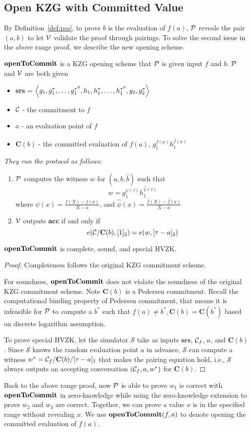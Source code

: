 \subsection{Open KZG with Committed Value}
\label{sec:kzgOpenComm}
By Definition~\ref{def:pcs}, to prove $b$ is the evaluation of $f(a)$, $\mathcal{P}$ reveals the pair $(a,b)$ to let $\mathcal{V}$ validate the proof through pairings. To solve the second issue in the above range proof, we describe the new opening scheme.
\begin{definition}[$\openc$]
$\openc$ is a KZG opening scheme that $\mathcal{P}$ is given input $f$ and $b$. $\mathcal{P}$ and $\mathcal{V}$ are both given
\begin{itemize}
    \item \textbf{srs} = $\left \langle g_1,g_1^\tau,\dots,g_1^{\tau^d},h_1,h_1^\tau,\dots,h_1^{\tau^d},g_2,g_2^\tau \right \rangle$
    \item $\mathcal{C}$ - the commitment to $f$
    \item $a$ - an evaluation point of $f$
    \item $\textbf{C}(b)$ - the committed evaluation of $f(a)$, $g_1^{f(a)}h_1^{\hat{f}(a)}$
\end{itemize}
\textit{They run the protocol as follows:}
\begin{enumerate}
    \item $\mathcal{P}$ computes the witness $w$ for $(a,b,\hat{b})$ such that
    \[ w=g_1^{\psi(\tau)}h_1^{\hat\psi(\tau)} \]
    where $\psi(x)=\frac{f(X)-f(a)}{X-a}$, and $\hat\psi(x)=\frac{\hat{f}(X)-\hat{f}(a)}{X-a}$
    \item $\mathcal{V}$ outputs \textbf{acc} if and only if
    \[ e(\mathcal{C}/\textbf{C}(b),[1]_2)=e(w,[\tau-a]_2) \]
\end{enumerate}
\end{definition}
\begin{theorem}
\label{thm:kzgOpen}
$\openc$ is complete, sound, and special HVZK.
\end{theorem}
\begin{proof}
Completeness follows the original KZG commitment scheme.

For soundness, $\openc$ does not violate the soundness of the original KZG commitment scheme. Note $\textbf{C}(b)$ is a Pedersen commitment. Recall the computational binding property of Pedersen commitment, that means it is infeasible for $\mathcal{P}$ to compute a $b^*$ such that $f(a)\ne{b^*},\textbf{C}(b)=\textbf{C}(b^*)$ based on discrete logarithm assumption.

To prove special HVZK, let the simulator $\mathcal{S}$ take as inputs $\textbf{srs}$, $\mathcal{C}_f$, $a$, and $\textbf{C}(b)$. Since $\mathcal{S}$ knows the random evaluation point $a$ in advance, $\mathcal{S}$ can compute a witness $w^*=\mathcal{C}_f/\textbf{C}(b)/[\tau-a]_1$ that makes the pairing equation hold, i.e., $\mathcal{S}$ always outputs an accepting conversation $(\mathcal{C}_f,a,w^*)$ for $\textbf{C}(b)$.
\end{proof}
Back to the above range proof, now $\mathcal{P}$ is able to prove $w_1$ is correct with $\openc$ in zero-knowledge while using the zero-knowledge extension to prove $w_2$ and $w_3$ are correct. Together, we can prove a value $x$ is in the specified range without revealing $x$. We use $\textbf{openToCommit}(f,a)$ to denote opening the committed evaluation of $f(a)$.

